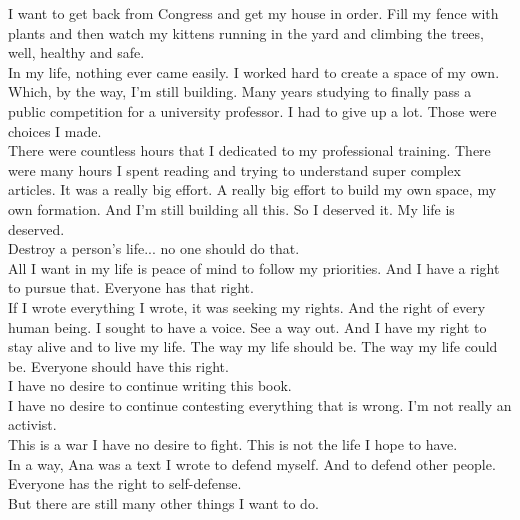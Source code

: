 \documentclass[11pt]{book}
\begin{document}
\noindent I want to get back from Congress and get my house in order. Fill my fence with plants and then watch my kittens running in the yard and climbing the trees, well, healthy and safe. \\

\noindent In my life, nothing ever came easily. I worked hard to create a space of my own. Which, by the way, I'm still building. Many years studying to finally pass a public competition for a university professor. I had to give up a lot. Those were choices I made. \\ 

\noindent There were countless hours that I dedicated to my professional training. There were many hours I spent reading and trying to understand super complex articles. It was a really big effort. A really big effort to build my own space, my own formation. And I'm still building all this. So I deserved it. My life is deserved. \\ 

\noindent Destroy a person's life... no one should do that. \\

\noindent All I want in my life is peace of mind to follow my priorities. And I have a right to pursue that. Everyone has that right. \\

\noindent If I wrote everything I wrote, it was seeking my rights. And the right of every human being. I sought to have a voice. See a way out. And I have my right to stay alive and to live my life. The way my life should be. The way my life could be. Everyone should have this right. \\

\noindent I have no desire to continue writing this book. \\

\noindent I have no desire to continue contesting everything that is wrong. I'm not really an activist. \\

\noindent This is a war I have no desire to fight. This is not the life I hope to have. \\

\noindent In a way, Ana was a text I wrote to defend myself. And to defend other people. Everyone has the right to self-defense. \\

\noindent But there are still many other things I want to do. \\
\end{document}
